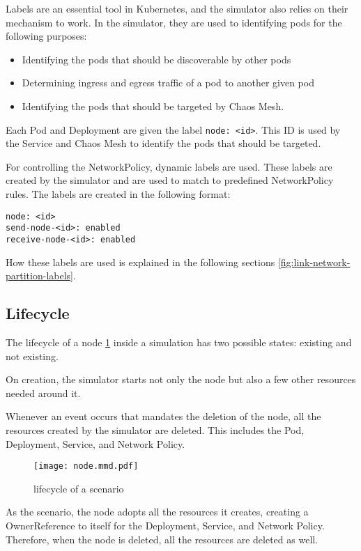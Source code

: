 Labels are an essential tool in Kubernetes, and the simulator also relies on their mechanism to work. In the simulator, they are used to identifying pods for the following purposes:

\begin{itemize}
  \item Identifying the pods that should be discoverable by other pods
  \item Determining ingress and egress traffic of a pod to another given pod
  \item Identifying the pods that should be targeted by Chaos Mesh.
\end{itemize}

Each Pod and Deployment are given the label \verb|node: <id>|. This ID is used by the Service and Chaos Mesh to identify the pods that should be targeted.

For controlling the NetworkPolicy, dynamic labels are used. These labels are created by the simulator and are used to match to predefined NetworkPolicy rules. The labels are created in the following format:

\begin{verbatim}
node: <id> 
send-node-<id>: enabled
receive-node-<id>: enabled
\end{verbatim}

How these labels are used is explained in the following sections \ref{fig:link-network-partition-labels}.

\subsection{Lifecycle}

The lifecycle of a node \ref{fig:node-lifecycle} inside a simulation has two possible states: existing and not existing.

On creation, the simulator starts not only the node but also a few other resources needed around it.

Whenever an event occurs that mandates the deletion of the node, all the resources created by the simulator are deleted. This includes the Pod, Deployment, Service, and Network Policy.

\begin{figure}[H]
  \label{fig:node-lifecycle}
  \caption{lifecycle of a scenario}
  \centering
  \texttt{[image: node.mmd.pdf]}
\end{figure}

As the scenario, the node adopts all the resources it creates, creating a OwnerReference to itself for the Deployment, Service, and Network Policy. Therefore, when the node is deleted, all the resources are deleted as well.

